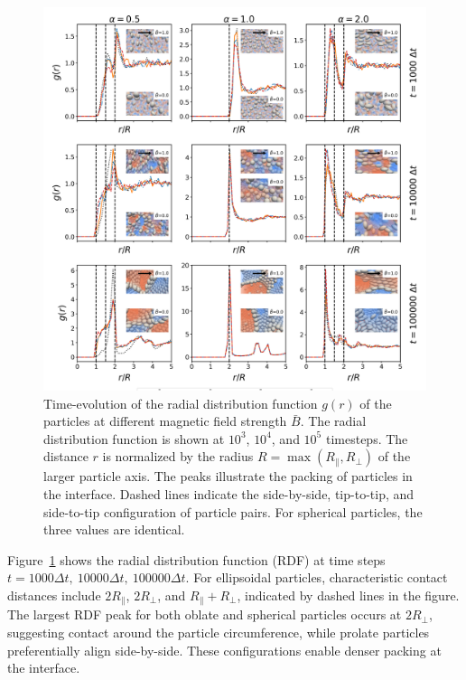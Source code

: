     \begin{figure}
    \centering
    \includegraphics[scale=0.4]{../figures/results/paper1/rdf_compare_time.png}
    \caption{Time-evolution of the radial distribution function $g(r)$ of the particles at different magnetic field strength $\bar{B}$. The radial 
    distribution function is shown at $10^3$, $10^4$, and $10^5$ timesteps. The distance $r$ is normalized by the radius $R=\max(R_\parallel,R_\perp)$ 
    of the larger particle axis. The peaks illustrate the packing of particles in the interface. Dashed lines indicate the side-by-side, tip-to-tip, and 
    side-to-tip configuration of particle pairs. For spherical particles, the three values are identical.}
    \label{fig:rdf}
    \end{figure}

Figure~\ref{fig:rdf} shows the radial distribution function (RDF) at time steps \(t = 1000\Delta t,\ 10000\Delta t,\ 100000\Delta t\). 
For ellipsoidal particles, characteristic contact distances include \(2R_{\parallel}\), \(2R_{\perp}\), and \(R_{\parallel} + R_{\perp}\), 
indicated by dashed lines in the figure. The largest RDF peak for both oblate and spherical particles occurs at \(2R_\perp\), suggesting 
contact around the particle circumference, while prolate particles preferentially align side-by-side. These configurations enable denser 
packing at the interface.

